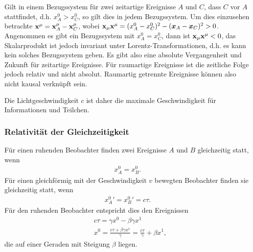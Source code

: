 Gilt in einem Bezugssystem für zwei zeitartige Ereignisse $A$ und $C$, dass $C$
vor $A$ stattfindet, d.h. $x_A^0 > x_C^0$, so gilt dies in jedem Bezugssystem.
Um dies einzusehen betrachte $\bm{\mathrm{x}}^\mu = \bm{\mathrm{x}}_A^\mu - \bm{\mathrm{x}}_C^\mu$,
wobei $\bm{\mathrm{x}}_\mu\bm{\mathrm{x}}^\mu  = (x_A^0-x_C^0)^2-(\bm{x}_A-\bm{x}_C)^2 > 0$.
Angenommen es gibt ein Bezugssystem mit $x_A^0=x_C^0$, dann ist
$\bm{\mathrm{x}}_\mu\bm{\mathrm{x}}^\mu < 0$, das Skalarprodukt ist jedoch invariant unter
Lorentz-Transformationen, d.h. es kann kein solches Bezugssystem geben.
Es gibt also eine absolute Vergangenheit und Zukunft für zeitartige Ereignisse.
Für raumartige Ereignisse ist die zeitliche Folge jedoch relativ und nicht
absolut. Raumartig getrennte Ereignisse können also nicht kausal verknüpft sein.

Die Lichtgeschwindigkeit $c$ ist daher die maximale Geschwindigkeit für
Informationen und Teilchen.

\subsubsection{Relativität der Gleichzeitigkeit}

Für einen ruhenden Beobachter finden zwei Ereignisse $A$ und $B$ gleichzeitig
statt, wenn
\begin{align*}
x_A^0 = x_B^0.
\end{align*}
Für einen gleichförmig mit der Geschwindigkeit $v$ bewegten Beobachter finden
sie gleichzeitig statt, wenn
\begin{align*}
{x_A^0}' = {x_B^{0}}' = c\tau.
\end{align*}
Für den ruhenden Beobachter entspricht dies den Ereignissen
\begin{align*}
&c\tau = \gamma x^0 - \beta\gamma x^1\\
&x^0 = \frac{c\tau + \beta\gamma x^1}{\gamma} = \frac{c\tau}{\gamma} +
\beta x^1,
\end{align*}
die auf einer Geraden mit Steigung $\beta$ liegen.

